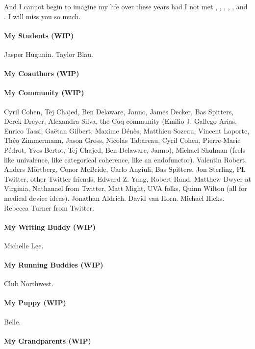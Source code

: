 \documentclass[ twoside,openright,titlepage,numbers=noenddot,headinclude,
                footinclude=true,cleardoublepage=empty,abstractoff,%
                BCOR=5mm,paper=letter,fontsize=11pt,letterpaper,%
                american,%
                ]{scrreprt}
\begin{document}
And I cannot begin to imagine my life over these years had I not met
, , , , ,
and . %
I will miss you so much.

\paragraph{My Students (WIP)}
Jasper Hugunin.
Taylor Blau.

\paragraph{My Coauthors (WIP)}

\paragraph{My Community (WIP)}
Cyril Cohen, Tej Chajed, Ben Delaware, Janno,
James Decker, Bas Spitters,
Derek Dreyer,
Alexandra Silva,
the Coq community (Emilio J. Gallego Arias, Enrico Tassi, Ga\"{e}tan Gilbert, Maxime D\'{e}n\`{e}s,
Matthieu Sozeau, Vincent Laporte, Th\'{e}o Zimmermann, Jason Gross, Nicolas Tabareau, Cyril Cohen, Pierre-Marie P\'{e}drot, Yves Bertot, Tej Chajed, Ben Delaware, Janno),
Michael Shulman (feels like univalence, like categorical coherence, like an endofunctor).
Valentin Robert.
Anders M\"ortberg, Conor McBride, Carlo Angiuli, Bas Spitters, Jon Sterling,
PL Twitter, other Twitter friends,
Edward Z. Yang, Robert Rand.
Matthew Dwyer at Virginia, Nathanael from Twitter, Matt Might, UVA folks, Quinn Wilton (all for medical device ideas).
Jonathan Aldrich.
David van Horn.
Michael Hicks. %
Rebecca Turner from Twitter.

\paragraph{My Writing Buddy (WIP)}
Michelle Lee.

\paragraph{My Running Buddies (WIP)}
Club Northwest.

\paragraph{My Puppy (WIP)}
Belle.

\paragraph{My Grandparents (WIP)}
\end{document}
